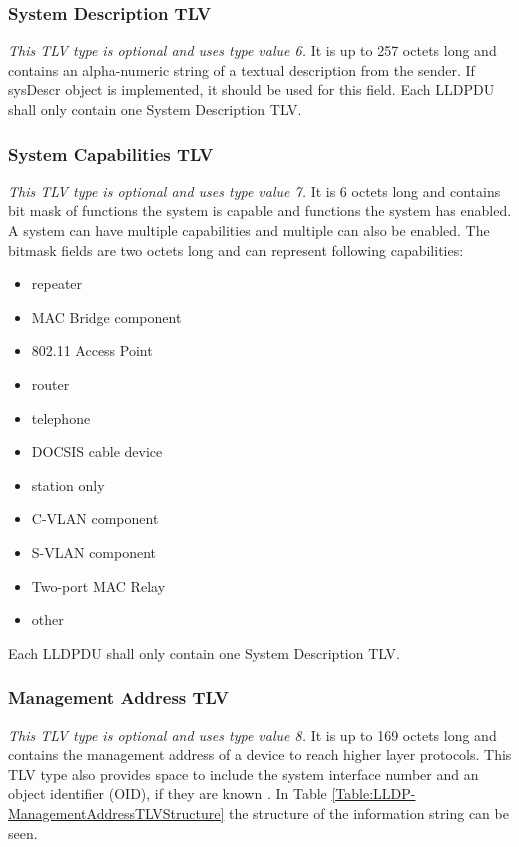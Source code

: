 \subsubsection{System Description TLV}
\label{Section:LLDP-SystemDescription}
\textit{This TLV type is optional and uses type value 6.} It is up to 257 octets long and contains an alpha-numeric string of a textual description from the sender. If sysDescr object \cite{RFC:RFC3418:2002} is implemented, it should be used for this field. Each LLDPDU shall only contain one System Description TLV.


\subsubsection{System Capabilities TLV}
\label{Section:LLDP-SystemCapabilities}
\textit{This TLV type is optional and uses type value 7.} It is 6 octets long and contains bit mask of functions the system is capable and functions the system has enabled. A system can have multiple capabilities and multiple can also be enabled. The bitmask fields are two octets long and can represent following capabilities:

\begin{minipage}{\textwidth}
\begin{itemize}
    \item repeater
    \item MAC Bridge component
    \item 802.11 Access Point
    \item router
    \item telephone
    \item DOCSIS cable device
    \item station only
    \item C-VLAN component
    \item S-VLAN component
    \item Two-port MAC Relay
    \item other
\end{itemize}
\end{minipage}

Each LLDPDU shall only contain one System Description TLV.

\subsubsection{Management Address TLV}
\label{Section:LLDP-ManagementAddress}
\textit{This TLV type is optional and uses type value 8.} It is up to 169 octets long and contains the management address of a device to reach higher layer protocols. This TLV type also provides space to include the system interface number and an object identifier (OID), if they are known \cite{IEEE:LLDP:2016}. In Table \ref{Table:LLDP-ManagementAddressTLVStructure} the structure of the information string can be seen.

